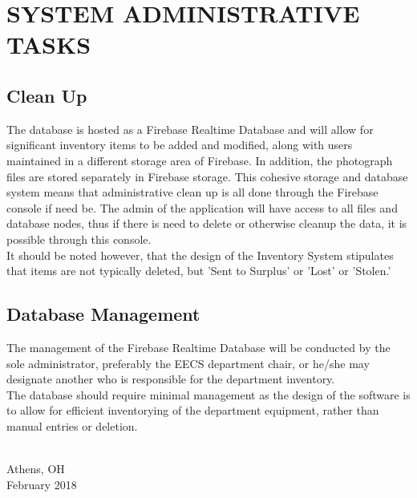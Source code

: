 \chapter{SYSTEM ADMINISTRATIVE TASKS}

\section{Clean Up}
The database is hosted as a Firebase Realtime Database and will allow for significant inventory items to be added and modified, along with users maintained in a different storage area of Firebase. In addition, the photograph files are stored separately in Firebase storage. This cohesive storage and database system means that administrative clean up is all done through the Firebase console if need be. The admin of the application will have access to all files and database nodes, thus if there is need to delete or otherwise cleanup the data, it is possible through this console.\\

\noindent
It should be noted however, that the design of the Inventory System stipulates that items are not typically deleted, but 'Sent to Surplus' or 'Lost' or 'Stolen.'

\section{Database Management}
The management of the Firebase Realtime Database will be conducted by the sole administrator, preferably the EECS department chair, or he/she may designate another who is responsible for the department inventory.\\

\noindent
The database should require minimal management as the design of the software is to allow for efficient inventorying of the department equipment, rather than manual entries or deletion.

\vspace*{\fill}
{ \\ Athens, OH \\ February 2018\par}
